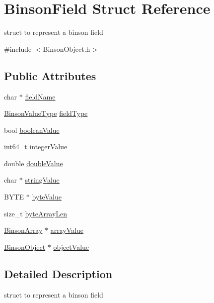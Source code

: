\hypertarget{structBinsonField}{\section{Binson\-Field Struct Reference}
\label{structBinsonField}
}


struct to represent a binson field  




{\ttfamily \#include $<$Binson\-Object.\-h$>$}

\subsection*{Public Attributes}
\begin{DoxyCompactItemize}
\item 
char $\ast$ \hyperlink{structBinsonField_a8e38391c6f73e3990fea571fd0727464}{field\-Name}
\item 
\hyperlink{BinsonObject_8h_acb56f3e416175bad42a8ad708f4e8b4c}{Binson\-Value\-Type} \hyperlink{structBinsonField_af4bacf88052af7898a681ffc5742064a}{field\-Type}
\item 
bool \hyperlink{structBinsonField_afa4d89c72451975c7d417411620eb1e4}{boolean\-Value}
\item 
int64\-\_\-t \hyperlink{structBinsonField_a88bc4483faecd28e1671135d2eb911b8}{integer\-Value}
\item 
double \hyperlink{structBinsonField_a4c3793330dba024f159946039066fa7c}{double\-Value}
\item 
char $\ast$ \hyperlink{structBinsonField_a3ffa60989adcf3dd00b3caa00b7b2677}{string\-Value}
\item 
B\-Y\-T\-E $\ast$ \hyperlink{structBinsonField_a71fab57bcc18cc20a8aad41674f3f9ee}{byte\-Value}
\item 
size\-\_\-t \hyperlink{structBinsonField_a3b9044d4e96879907046a9f9bb8e5d66}{byte\-Array\-Len}
\item 
\hyperlink{structBinsonArray}{Binson\-Array} $\ast$ \hyperlink{structBinsonField_a40d1815efc1752e7702742db8c75a412}{array\-Value}
\item 
\hyperlink{structBinsonObject}{Binson\-Object} $\ast$ \hyperlink{structBinsonField_abc7256cc86bc89a5d4946e7a2cdea809}{object\-Value}
\end{DoxyCompactItemize}


\subsection{Detailed Description}
struct to represent a binson field 

